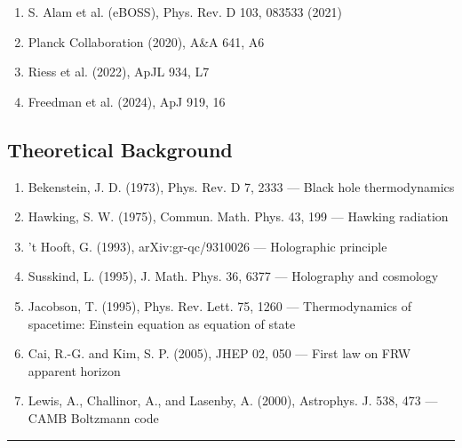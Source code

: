 \documentclass[11pt]{article}
\begin{document}
\begin{enumerate}
    \item S. Alam et al. (eBOSS), Phys. Rev. D 103, 083533 (2021)
    \item Planck Collaboration (2020), A\&A 641, A6
    \item Riess et al. (2022), ApJL 934, L7
    \item Freedman et al. (2024), ApJ 919, 16
\end{enumerate}

\subsection{Theoretical Background}

\begin{enumerate}
    \item Bekenstein, J. D. (1973), Phys. Rev. D 7, 2333 --- Black hole thermodynamics
    \item Hawking, S. W. (1975), Commun. Math. Phys. 43, 199 --- Hawking radiation
    \item 't Hooft, G. (1993), arXiv:gr-qc/9310026 --- Holographic principle
    \item Susskind, L. (1995), J. Math. Phys. 36, 6377 --- Holography and cosmology
    \item Jacobson, T. (1995), Phys. Rev. Lett. 75, 1260 --- Thermodynamics of spacetime: Einstein equation as equation of state
    \item Cai, R.-G. and Kim, S. P. (2005), JHEP 02, 050 --- First law on FRW apparent horizon
    \item Lewis, A., Challinor, A., and Lasenby, A. (2000), Astrophys. J. 538, 473 --- CAMB Boltzmann code
\end{enumerate}


\vfill

\noindent\rule{\textwidth}{0.4pt}
\end{document}

